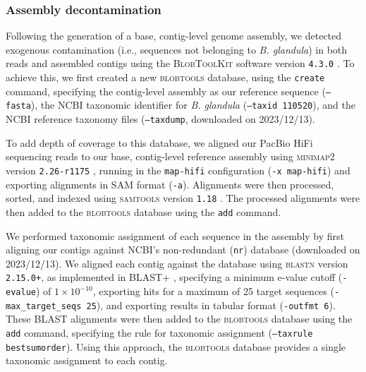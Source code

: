 \documentclass[11pt]{article}
\newcommand{\bgla}{\textit{B. glandula}\xspace}
\begin{document}
\subsubsection*{Assembly decontamination}

Following the generation of a base, contig-level genome assembly, we detected
exogenous contamination (i.e., sequences not belonging to \bgla)
in both reads and assembled contigs using the \textsc{BlobToolKit} software version
\texttt{4.3.0} \citep{challis_blobtoolkit_2020}. To achieve this, we first created
a new \textsc{blobtools} database, using the \texttt{create} command, specifying the
contig-level assembly as our reference sequence (\texttt{--fasta}), the NCBI
taxonomic identifier for \bgla{} (\texttt{--taxid 110520}), and the NCBI reference
taxonomy files (\texttt{--taxdump}, downloaded on 2023/12/13).
\vspace{0.2cm}

To add depth of coverage to this database, we aligned our PacBio HiFi sequencing
reads to our base, contig-level reference assembly using \textsc{minimap2} version
\texttt{2.26-r1175} \citep{li_minimap2_2018}, running in the \texttt{map-hifi}
configuration (\texttt{-x map-hifi}) and exporting alignments in SAM format
(\texttt{-a}). Alignments were then processed, sorted, and indexed using
\textsc{samtools} version \texttt{1.18} \citep{li_sequence_2009}. The processed
alignments were then added to the \textsc{blobtools} database using the \texttt{add}
command.
\vspace{0.2cm}

We performed taxonomic assignment of each sequence in the assembly by first aligning
our contigs against NCBI's non-redundant (\texttt{nr}) database (downloaded on
2023/12/13). We aligned each contig against the database using \textsc{blastn} version
\texttt{2.15.0+}, as implemented in \textsc{BLAST+} \citep{camacho_blast_2009},
specifying a minimum e-value cutoff (\texttt{-evalue}) of $1\times10^{-10}$, exporting
hits for a maximum of 25 target sequences (\texttt{-max\_target\_seqs 25}), and exporting
results in tabular format (\texttt{-outfmt 6}). These \textsc{BLAST} alignments
were then added to the \textsc{blobtools} database using the \texttt{add} command,
specifying the rule for taxonomic assignment (\texttt{--taxrule bestsumorder}).
Using this approach, the \textsc{blobtools} database provides a single taxonomic
assignment to each contig.
\vspace{0.2cm}
\end{document}
